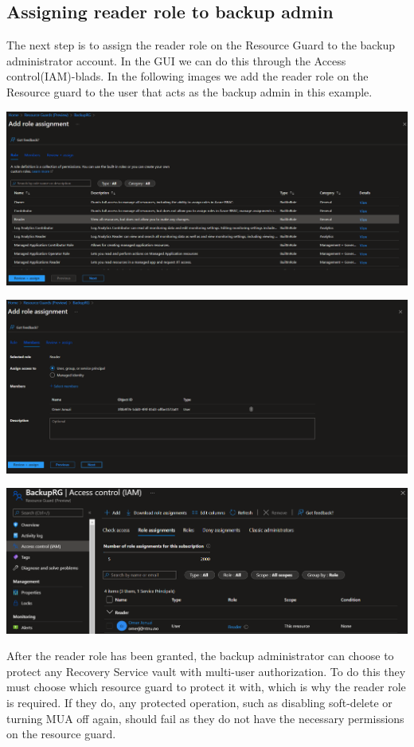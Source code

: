 \subsection{Assigning reader role to backup admin}
The next step is to assign the reader role on the Resource Guard to the backup administrator account. In the GUI we can do this through the Access control(IAM)-blads. In the following images we add the reader role on the Resource guard to the user that acts as the backup admin in this example.

\includegraphics[width=.9\linewidth]{figures/RG-roles.PNG}

\includegraphics[width=.9\linewidth]{figures/RG-user.PNG}

\includegraphics[width=.9\linewidth]{figures/RG-ACblade.PNG}


After the reader role has been granted, the backup administrator can choose to protect any Recovery Service vault with multi-user authorization. To do this they must choose which resource guard to protect it with, which is why the reader role is required. If they do, any protected operation, such as disabling soft-delete or turning MUA off again, should fail as they do not have the necessary permissions on the resource guard. 


